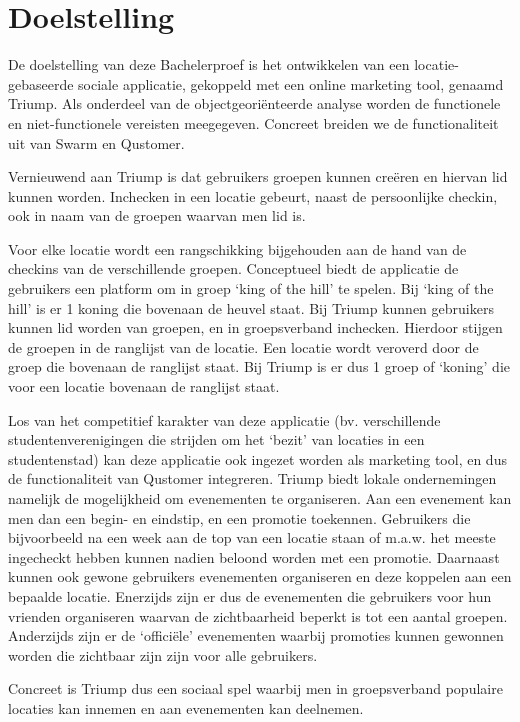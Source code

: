 
\chapter{Doelstelling}

De doelstelling van deze Bachelerproef is het ontwikkelen van een locatie-gebaseerde sociale applicatie, gekoppeld met een online marketing tool, genaamd Triump. Als onderdeel van de objectgeoriënteerde analyse worden de functionele en niet-functionele vereisten meegegeven.
Concreet breiden we de functionaliteit uit van Swarm en Qustomer. 

Vernieuwend aan Triump is dat gebruikers groepen kunnen creëren en hiervan lid kunnen worden. Inchecken in een locatie gebeurt, naast de persoonlijke checkin, ook in naam van de groepen waarvan men lid is. 

Voor elke locatie wordt een rangschikking bijgehouden aan de hand van de checkins van de verschillende groepen. Conceptueel biedt de applicatie de gebruikers een platform om in groep `king of the hill' te spelen. Bij `king of the hill' is er 1 koning die bovenaan de heuvel staat. Bij Triump kunnen gebruikers kunnen lid worden van groepen, en in groepsverband inchecken. Hierdoor stijgen de groepen in de ranglijst van de locatie. Een locatie wordt veroverd door de groep die bovenaan de ranglijst staat.
Bij Triump is er dus 1 groep of `koning' die voor een locatie bovenaan de ranglijst staat.

Los van het competitief karakter van deze applicatie (bv. verschillende studentenverenigingen die strijden om het ‘bezit’ van locaties in een studentenstad) kan deze applicatie ook ingezet worden als marketing tool, en dus de functionaliteit van Qustomer integreren.
Triump biedt lokale ondernemingen namelijk de mogelijkheid om evenementen te organiseren. Aan een evenement kan men dan een begin- en eindstip, en een promotie toekennen. Gebruikers die bijvoorbeeld na een week aan de top van een locatie staan of m.a.w. het meeste ingecheckt hebben kunnen nadien beloond worden met een promotie. Daarnaast kunnen ook gewone gebruikers evenementen organiseren en deze koppelen aan een bepaalde locatie.
Enerzijds zijn er dus de evenementen die gebruikers voor hun vrienden organiseren waarvan de zichtbaarheid beperkt is tot een aantal groepen. Anderzijds zijn er de `officiële' evenementen waarbij promoties kunnen gewonnen worden die zichtbaar zijn zijn voor alle gebruikers. 

Concreet is Triump dus een sociaal spel waarbij men in groepsverband populaire locaties kan innemen en aan evenementen kan deelnemen.

